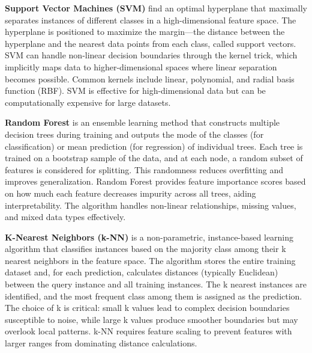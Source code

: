 \textbf{Support Vector Machines (SVM)} find an optimal hyperplane that maximally separates instances of different classes in a high-dimensional feature space. The hyperplane is positioned to maximize the margin—the distance between the hyperplane and the nearest data points from each class, called support vectors. SVM can handle non-linear decision boundaries through the kernel trick, which implicitly maps data to higher-dimensional spaces where linear separation becomes possible. Common kernels include linear, polynomial, and radial basis function (RBF). SVM is effective for high-dimensional data but can be computationally expensive for large datasets.


\textbf{Random Forest} is an ensemble learning method that constructs multiple decision trees during training and outputs the mode of the classes (for classification) or mean prediction (for regression) of individual trees. Each tree is trained on a bootstrap sample of the data, and at each node, a random subset of features is considered for splitting. This randomness reduces overfitting and improves generalization. Random Forest provides feature importance scores based on how much each feature decreases impurity across all trees, aiding interpretability. The algorithm handles non-linear relationships, missing values, and mixed data types effectively.


\textbf{K-Nearest Neighbors (k-NN)} is a non-parametric, instance-based learning algorithm that classifies instances based on the majority class among their k nearest neighbors in the feature space. The algorithm stores the entire training dataset and, for each prediction, calculates distances (typically Euclidean) between the query instance and all training instances. The k nearest instances are identified, and the most frequent class among them is assigned as the prediction. The choice of k is critical: small k values lead to complex decision boundaries susceptible to noise, while large k values produce smoother boundaries but may overlook local patterns. k-NN requires feature scaling to prevent features with larger ranges from dominating distance calculations.

